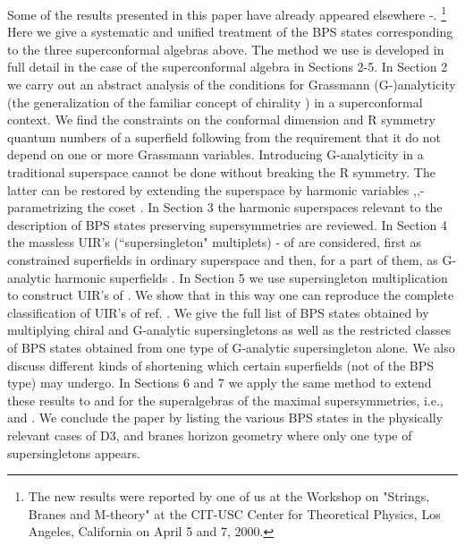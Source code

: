 \documentclass[a4paper,12pt]{article}
\begin{document}
Some of the results presented in this paper have already appeared 
elsewhere \cite{AFSZ}-\cite{FS3}. \footnote{The new results were 
reported by one of us at the Workshop on "Strings, Branes and 
M-theory" at the CIT-USC Center for Theoretical Physics, Los 
Angeles, California on April 5 and 7, 2000.} Here we give a 
systematic and unified treatment of the BPS states corresponding 
to the three superconformal algebras above. The method we use is 
developed in full detail in the case of the \coordHE{} superconformal 
algebra \coordHE{} in Sections 2-5. In Section 2 we carry 
out an abstract analysis of the conditions for Grassmann 
(G-)analyticity  \cite{GIO} (the generalization of the familiar 
concept of chirality \cite{fwz}) in a superconformal context. We 
find the  constraints on the conformal dimension and R symmetry 
quantum numbers of a superfield following from the requirement 
that it do not depend on one or more Grassmann variables. 
Introducing G-analyticity in a traditional superspace cannot be 
done without breaking the R symmetry. The latter can be restored 
by extending the superspace by harmonic variables 
\cite{Rosly},\cite{GIK1},\cite{GIK11}-\cite{Bandos} parametrizing 
the coset \coordHE{}. In Section 3 the \coordHE{} harmonic 
superspaces \cite{GIK3,hh} relevant to the description of BPS 
states preserving \coordHE{} supersymmetries are reviewed. In 
Section 4 the massless UIR's (``supersingleton" multiplets) 
\cite{ff2}-\cite{bin} of \coordHE{} are considered, first 
as constrained superfields in ordinary superspace 
\cite{Siegel,HST} and then, for a part of them, as \coordHE{} 
G-analytic harmonic superfields \cite{GIK1,hh}. In Section 5 we 
use supersingleton multiplication to construct UIR's of  
\coordHE{}. We show that in this way one can reproduce 
the complete classification of UIR's of ref. \cite{dp}. We give 
the full list of BPS states obtained by multiplying chiral and 
G-analytic supersingletons as well as the restricted classes of 
BPS states obtained from one type of G-analytic supersingleton 
alone. We also discuss different kinds of shortening which 
certain superfields (not of the BPS type) may undergo. In 
Sections 6 and 7 we apply the same method to extend these results 
to \coordHE{} and \coordHE{} for the superalgebras of the maximal 
supersymmetries, i.e., \coordHE{} and 
\coordHE{}. We conclude the paper by listing 
the various BPS states in the physically relevant cases of D3, 
\coordHE{} and \coordHE{} branes horizon geometry where only one type of 
supersingletons appears. 
\end{document}
